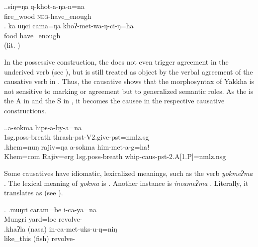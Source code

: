 \ex.\ag.siŋ=ŋa ŋ-khot-a-ŋa-n=na\\
	fire\_wood \textsc{neg}-have\_enough\\
	\bg. ka uŋci cama=ŋa khoʔ-met-wa-ŋ-ci-ŋ=ha\\
	  food	have\_enough\\
		 (lit. )

		
In the possessive  construction, the  does not even trigger agreement in the underived verb (see \Next[a]), but is still treated as object by the verbal agreement of the causative verb in \Next[b]. Thus, the causative shows that the morphosyntax of Yakkha is not sensitive to  marking or agreement but to generalized semantic roles. As the  is the A in \Last and the S in \Next, it becomes the causee in the respective causative constructions. 

	\ex.\ag.a-sokma hips-a-by-a=na\\
	{\sc 1sg.poss-}breath thrash{\sc [3sg]-pst-V2.give-pst=nmlz.sg}\\	
	 \bg.khem=nuŋ rajiv=ŋa a-sokma him-met-a-g=haǃ\\
	Khem{\sc =com}  Rajiv{\sc =erg} {\sc 1sg.poss-}breath whip{\sc -caus-pst-2.A[1.P]=nmlz.nsg}\\


Some causatives have idiomatic, lexicalized meanings, such as the verb \emph{yokmeʔma} . The lexical meaning of \emph{yokma} is . Another instance is \emph{incameʔma} . Literally, it translates as  (see \Next).

 
\ex. \ag.muŋri caram=be i-ca-ya=na\\
Mungri yard{\sc =loc} revolve-\\
\bg.khaʔla (nasa) in-ca-met-uks-u-ŋ=niŋ\\
	like\_this (fish) revolve-\\
	   
 

